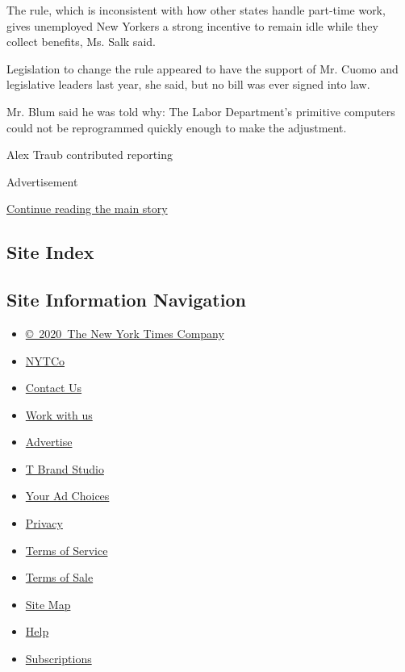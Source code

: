 The rule, which is inconsistent with how other states handle part-time
work, gives unemployed New Yorkers a strong incentive to remain idle
while they collect benefits, Ms. Salk said.

Legislation to change the rule appeared to have the support of Mr. Cuomo
and legislative leaders last year, she said, but no bill was ever signed
into law.

Mr. Blum said he was told why: The Labor Department's primitive
computers could not be reprogrammed quickly enough to make the
adjustment.

Alex Traub contributed reporting

Advertisement

\protect\hyperlink{after-bottom}{Continue reading the main story}

\hypertarget{site-index}{%
\subsection{Site Index}\label{site-index}}

\hypertarget{site-information-navigation}{%
\subsection{Site Information
Navigation}\label{site-information-navigation}}

\begin{itemize}
\tightlist
\item
  \href{https://help.nytimes.com/hc/en-us/articles/115014792127-Copyright-notice}{©~2020~The
  New York Times Company}
\end{itemize}

\begin{itemize}
\tightlist
\item
  \href{https://www.nytco.com/}{NYTCo}
\item
  \href{https://help.nytimes.com/hc/en-us/articles/115015385887-Contact-Us}{Contact
  Us}
\item
  \href{https://www.nytco.com/careers/}{Work with us}
\item
  \href{https://nytmediakit.com/}{Advertise}
\item
  \href{http://www.tbrandstudio.com/}{T Brand Studio}
\item
  \href{https://www.nytimes.com/privacy/cookie-policy\#how-do-i-manage-trackers}{Your
  Ad Choices}
\item
  \href{https://www.nytimes.com/privacy}{Privacy}
\item
  \href{https://help.nytimes.com/hc/en-us/articles/115014893428-Terms-of-service}{Terms
  of Service}
\item
  \href{https://help.nytimes.com/hc/en-us/articles/115014893968-Terms-of-sale}{Terms
  of Sale}
\item
  \href{https://spiderbites.nytimes.com}{Site Map}
\item
  \href{https://help.nytimes.com/hc/en-us}{Help}
\item
  \href{https://www.nytimes.com/subscription?campaignId=37WXW}{Subscriptions}
\end{itemize}
